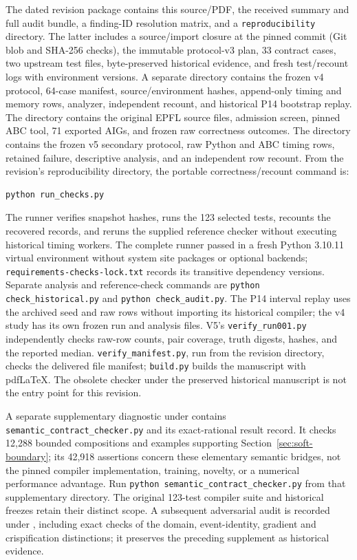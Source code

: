 \documentclass[10pt]{article}
\theoremstyle{plain}
\theoremstyle{definition}
\theoremstyle{remark}
\begin{document}
The dated revision package contains this source/PDF, the received summary and full audit bundle, a finding-ID resolution matrix, and a \texttt{reproducibility} directory. The latter includes a source/import closure at the pinned commit (Git blob and SHA-256 checks), the immutable protocol-v3 plan, 33 contract cases, two upstream test files, byte-preserved historical evidence, and fresh test/recount logs with environment versions. A separate  directory contains the frozen v4 protocol, 64-case manifest, source/environment hashes, append-only timing and memory rows, analyzer, independent recount, and historical P14 bootstrap replay. The  directory contains the original EPFL source files, admission screen, pinned ABC tool, 71 exported AIGs, and frozen raw correctness outcomes. The  directory contains the frozen v5 secondary protocol, raw Python and ABC timing rows, retained failure, descriptive analysis, and an independent row recount. From the revision's reproducibility directory, the portable correctness/recount command is:
\begin{lstlisting}
python run_checks.py
\end{lstlisting}
The runner verifies snapshot hashes, runs the 123 selected tests, recounts the recovered records, and reruns the supplied reference checker without executing historical timing workers. The complete runner passed in a fresh Python 3.10.11 virtual environment without system site packages or optional backends; \texttt{requirements-checks-lock.txt} records its transitive dependency versions. Separate analysis and reference-check commands are \texttt{python check\_historical.py} and \texttt{python check\_audit.py}. The P14 interval replay uses the archived seed and raw rows without importing its historical compiler; the v4 study has its own frozen run and analysis files. V5's \texttt{verify\_run001.py} independently checks raw-row counts, pair coverage, truth digests, hashes, and the reported median. \texttt{verify\_manifest.py}, run from the revision directory, checks the delivered file manifest; \texttt{build.py} builds the manuscript with pdfLaTeX. The obsolete checker under the preserved historical manuscript is not the entry point for this revision.

A separate supplementary diagnostic under  contains \texttt{semantic\_contract\_checker.py} and its exact-rational result record. It checks 12,288 bounded compositions and examples supporting Section~\ref{sec:soft-boundary}; its 42,918 assertions concern these elementary semantic bridges, not the pinned compiler implementation, training, novelty, or a numerical performance advantage. Run \texttt{python semantic\_contract\_checker.py} from that supplementary directory. The original 123-test compiler suite and historical freezes retain their distinct scope. A subsequent adversarial audit is recorded under , including exact checks of the domain, event-identity, gradient and crispification distinctions; it preserves the preceding supplement as historical evidence.
\end{document}
